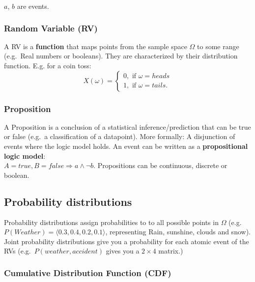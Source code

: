\documentclass[
]{book}
\begin{document}
\(a\), \(b\) are events.

\hypertarget{random-variable-rv}{%
\subsubsection{Random Variable (RV)}\label{random-variable-rv}}

A RV is a \textbf{function} that maps points from the sample space \(\Omega\)
to some range (e.g.~Real numbers or booleans). They are characterized by
their distribution function. E.g. for a coin toss:
\[X(\omega) = \begin{cases} 
                0, \text{ if } \omega = heads\\
                1, \text{ if } \omega = tails.
            \end{cases}\]

\hypertarget{proposition}{%
\subsubsection{Proposition}\label{proposition}}

A Proposition is a conclusion of a statistical inference/prediction that
can be true or false (e.g.~a classification of a datapoint). More
formally: A disjunction of events where the logic model holds. An event
can be written as a \textbf{propositional logic model}:\\
\(A = true, B = false \Rightarrow a \land \neg b\). Propositions can be
continuous, discrete or boolean.

\hypertarget{probability-distributions}{%
\subsection{Probability distributions}\label{probability-distributions}}

Probability distributions assign probabilities to to all possible points
in \(\Omega\) (e.g.~\(P(Weather) = \langle 0.3, 0.4, 0.2, 0.1 \rangle\),
representing Rain, sunshine, clouds and snow). Joint probability
distributions give you a probability for each atomic event of the RVs
(e.g.~\(P(weather, accident)\) gives you a \(2\times 4\) matrix.)

\hypertarget{cumulative-distribution-function-cdf}{%
\subsubsection{Cumulative Distribution Function (CDF)}\label{cumulative-distribution-function-cdf}}
\end{document}
